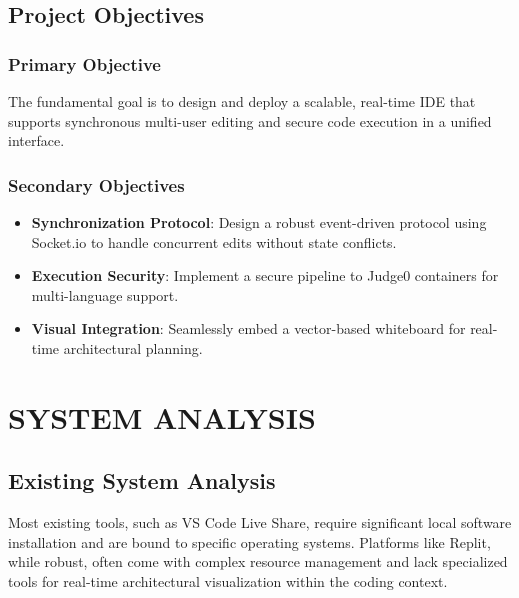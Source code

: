 \documentclass[12pt,a4paper]{report}
\begin{document}
\section{Project Objectives}
\subsection{Primary Objective}
The fundamental goal is to design and deploy a scalable, real-time IDE that supports synchronous multi-user editing and secure code execution in a unified interface.

\subsection{Secondary Objectives}
\begin{itemize}
    \item \textbf{Synchronization Protocol}: Design a robust event-driven protocol using Socket.io to handle concurrent edits without state conflicts.
    \item \textbf{Execution Security}: Implement a secure pipeline to Judge0 containers for multi-language support.
    \item \textbf{Visual Integration}: Seamlessly embed a vector-based whiteboard for real-time architectural planning.
\end{itemize}

\newpage

\chapter{SYSTEM ANALYSIS}
\section{Existing System Analysis}
Most existing tools, such as VS Code Live Share, require significant local software installation and are bound to specific operating systems. Platforms like Replit, while robust, often come with complex resource management and lack specialized tools for real-time architectural visualization within the coding context.
\end{document}
